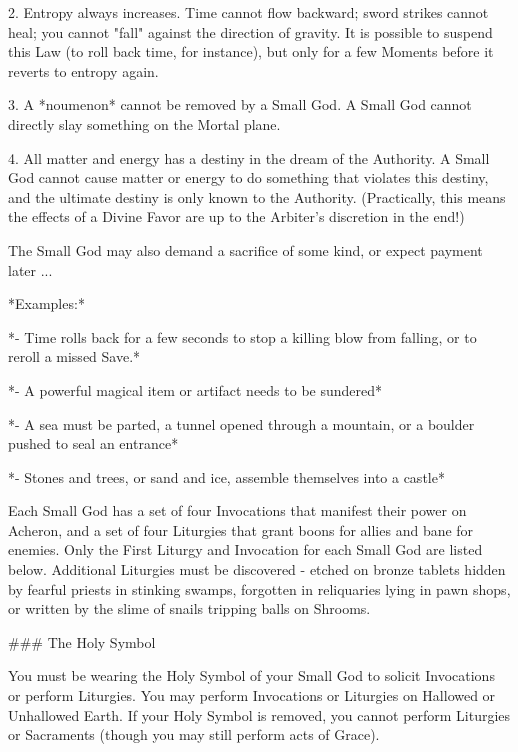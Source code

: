 2. Entropy always increases.  Time cannot flow backward; sword strikes cannot heal; you cannot "fall" against the direction of gravity. It is possible to suspend this Law (to roll back time, for instance), but only for a few Moments before it reverts to entropy again.

3. A *noumenon* cannot be removed by a Small God. A Small God cannot directly slay something on the Mortal plane.

4. All matter and energy has a destiny in the dream of the Authority.  A Small God cannot cause matter or energy to do something that violates this destiny, and the ultimate destiny is only known to the Authority. (Practically, this means the effects of a Divine Favor are up to the Arbiter's discretion in the end!)


The Small God may also demand a sacrifice of some kind, or expect payment later ...





*Examples:*

*- Time rolls back for a few seconds to stop a killing blow from falling, or to reroll a missed Save.*

*- A powerful magical item or artifact needs to be sundered*

*- A sea must be parted, a tunnel opened through a mountain, or a boulder pushed to seal an entrance*

*- Stones and trees, or sand and ice, assemble themselves into a castle*








Each Small God has a set of four Invocations that manifest their power on Acheron, and a set of four Liturgies that grant boons for allies and bane for enemies.  Only the First Liturgy and Invocation for each Small God are listed below. Additional Liturgies must be discovered - etched on bronze tablets hidden by fearful priests in stinking swamps, forgotten in reliquaries lying in pawn shops, or written by the slime of snails tripping balls on Shrooms.

###  The Holy Symbol

You must be wearing the Holy Symbol of your Small God to solicit Invocations or perform Liturgies.  You may perform Invocations or Liturgies on Hallowed or Unhallowed Earth.  If your Holy Symbol is removed, you cannot perform Liturgies or Sacraments (though you may still perform acts of Grace).  

